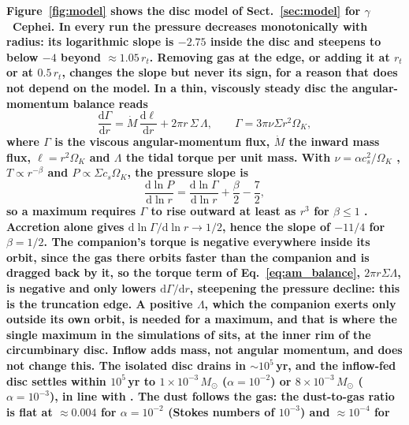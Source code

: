 \documentclass{aa}
\newcommand{\rev}[1]{{\color{red}\textbf{#1}}}
\begin{document}
\rev{Figure~\ref{fig:model} shows the disc model of Sect.~\ref{sec:model}
for $\gamma$~Cephei. In every run the pressure decreases monotonically
with radius: its logarithmic slope is $-2.75$ inside the disc and
steepens to below $-4$ beyond $\approx1.05\,r_t$. Removing gas at the
edge, or adding it at $r_t$ or at $0.5\,r_t$, changes the slope but never
its sign, for a reason that does not depend on the model. In a thin,
viscously steady disc the angular-momentum balance reads
\citep{Lynden-Bell1974, Kanagawa2015_torque_exp}
\begin{equation}
\frac{\mathrm{d}\Gamma}{\mathrm{d}r} = \dot{M}\,\frac{\mathrm{d}\ell}{\mathrm{d}r}
+ 2\pi r\,\Sigma\,\Lambda, \qquad \Gamma = 3\pi\nu\Sigma r^2\Omega_K,
\label{eq:am_balance}
\end{equation}
where $\Gamma$ is the viscous angular-momentum flux, $\dot{M}$ the inward mass
flux, $\ell = r^2\Omega_K$ and $\Lambda$ the tidal torque per unit mass.
With $\nu = \alpha c_s^2/\Omega_K$ \citep{Shakura1973}, $T \propto
r^{-\beta}$ and $P \propto \Sigma c_s\Omega_K$, the pressure slope is
\begin{equation}
\frac{\mathrm{d}\ln P}{\mathrm{d}\ln r} =
\frac{\mathrm{d}\ln \Gamma}{\mathrm{d}\ln r} + \frac{\beta}{2} - \frac{7}{2},
\label{eq:pressure_slope}
\end{equation}
so a maximum requires $\Gamma$ to rise outward at least as $r^{3}$ for
$\beta \le 1$ \citep{Chiang1997}. Accretion alone gives
$\mathrm{d}\ln \Gamma/\mathrm{d}\ln r \to 1/2$, hence the slope of $-11/4$
for $\beta = 1/2$. The companion's torque is negative everywhere inside
its orbit, since the gas there orbits faster than the companion and is
dragged back by it, so the torque term of Eq.~\eqref{eq:am_balance},
$2\pi r\Sigma\Lambda$, is negative and only lowers
$\mathrm{d}\Gamma/\mathrm{d}r$, steepening the pressure decline: this is
the truncation edge. A positive $\Lambda$, which the companion exerts only
outside its own orbit, is needed for a maximum, and that is where the
single maximum in the simulations of \citet{Marzari2025, Marzari2025b}
sits, at the inner rim of the circumbinary disc. Inflow adds mass, not
angular momentum, and does not change this. The isolated disc drains in $\sim10^5$\,yr, and the inflow-fed
disc settles within $10^5$\,yr to $1\times10^{-3}\,M_\odot$
($\alpha = 10^{-2}$) or $8\times10^{-3}\,M_\odot$ ($\alpha = 10^{-3}$),
in line with \citet{Marzari2025}. The dust follows the gas: the
dust-to-gas ratio is flat at $\approx0.004$ for $\alpha = 10^{-2}$
(Stokes numbers of $10^{-3}$) and $\approx10^{-4}$ for
}
\end{document}
